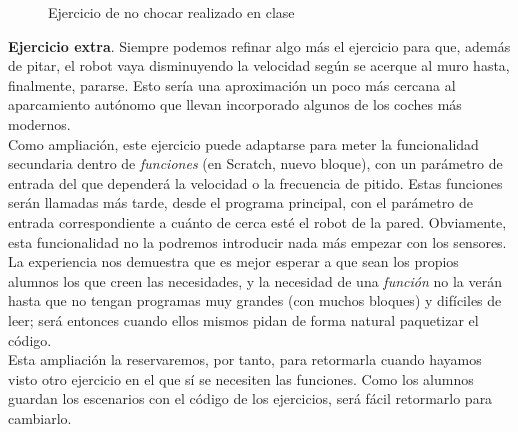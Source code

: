 \begin{description}
\begin{figure}[h]
	\centering
	
	\begin{subfigure}
		[Un ejemplo de solución para el ejercicio de no chocar: \href{https://www.youtube.com/watch?v=dMYWTzXvXlE}{en este vídeo} ]{
			\texttt{[image: muro1.png]}	
			\label{img:muro1}
		}
	\end{subfigure}
	\begin{subfigure}
		[Otro ejemplo de solución para el ejercicio de no chocar: \href{https://www.youtube.com/shorts/HWSd4kJJ7kY}{en este vídeo}]{
			\texttt{[image: muro2.png]}	
			\label{img:muro2}
		}
	\end{subfigure}
	
	\caption{Ejercicio de no chocar realizado en clase}
	\label{img:muroEjercicio}
\end{figure}

\textbf{Ejercicio extra}. Siempre podemos refinar algo más el ejercicio para que, además de pitar, el robot vaya disminuyendo la velocidad según se acerque al muro hasta, finalmente, pararse. Esto sería una aproximación un poco más cercana al aparcamiento autónomo que llevan incorporado algunos de los coches más modernos.\\
Como ampliación, este ejercicio puede adaptarse para meter la funcionalidad secundaria dentro de \textit{funciones} (en Scratch, nuevo bloque), con un parámetro de entrada del que dependerá la velocidad o la frecuencia de pitido. Estas funciones serán llamadas más tarde, desde el programa principal, con el parámetro de entrada correspondiente a cuánto de cerca esté el robot de la pared. Obviamente, esta funcionalidad no la podremos introducir nada más empezar con los sensores. La experiencia nos demuestra que es mejor esperar a que sean los propios alumnos los que creen las necesidades, y la necesidad de una \textit{función} no la verán hasta que no tengan programas muy grandes (con muchos bloques) y difíciles de leer; será entonces cuando ellos mismos pidan de forma natural paquetizar el código.\\
Esta ampliación la reservaremos, por tanto, para retormarla cuando hayamos visto otro ejercicio en el que sí se necesiten las funciones. Como los alumnos guardan los escenarios con el código de los ejercicios, será fácil retormarlo para cambiarlo.


\end{description}
